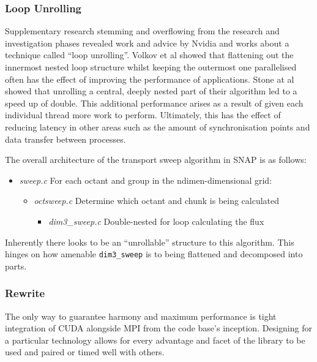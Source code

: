 \documentclass[conference]{IEEEtran}
\begin{document}
\subsubsection{Loop Unrolling}

Supplementary research stemming and overflowing from the research and investigation phases revealed work and advice by Nvidia and works about a technique called ``loop unrolling''. Volkov et al\cite{volkov2011unrolling} showed that flattening out the innermost nested loop structure whilst keeping the outermost one parallelised often has the effect of improving the performance of applications. Stone at al\cite{stone2007accelerating} showed that unrolling a central, deeply nested part of their algorithm led to a speed up of double. This additional performance arises as a result of given each individual thread more work to perform. Ultimately, this has the effect of reducing latency in other areas such as the amount of synchronisation points and data transfer between processes.

The overall architecture of the transport sweep algorithm in SNAP is as follows:

\begin{itemize}
    \item \textit{sweep.c}
    For each octant and group in the ndimen-dimensional grid:
    \begin{itemize}
        \item \textit{octsweep.c}
        Determine which octant and chunk is being calculated
        \begin{itemize}
            \item \textit{dim3\_sweep.c}
            Double-nested for loop calculating the flux
        \end{itemize}
    \end{itemize}
\end{itemize}

Inherently there looks to be an ``unrollable'' structure to this algorithm. This hinges on how amenable \texttt{dim3\_sweep} is to being flattened and decomposed into parts.

\subsubsection{Rewrite}

The only way to guarantee harmony and maximum performance is tight integration of CUDA alongside MPI from the code base's inception. Designing for a particular technology allows for every advantage and facet of the library to be used and paired or timed well with others.
\end{document}
